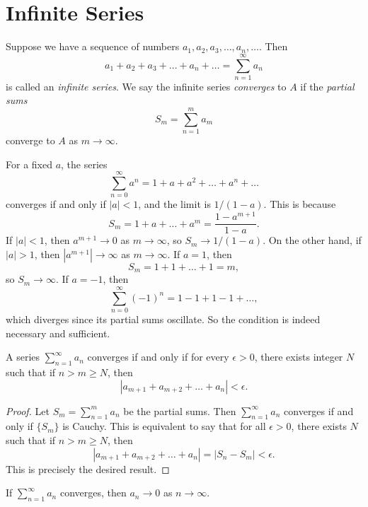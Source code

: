 \section{Infinite Series}
\begin{definition}
Suppose we have a sequence of numbers
$a_1, a_2, a_3, \dots, a_n, \dots$. Then
\[
  a_1 + a_2 + a_3 + \dots + a_n + \dots
  = \sum_{n = 1}^\infty a_n
\]
is called an \emph{infinite series}. We say the
infinite series \emph{converges} to $A$ if
the \emph{partial sums}
\[
  S_m = \sum_{n = 1}^m a_m
\]
converge to $A$ as $m \to \infty$.
\end{definition}

\begin{example}
  For a fixed $a$, the series
  \[
    \sum_{n = 0}^\infty a^n = 1 + a + a^2 + \dots + a^n + \dots
  \]
  converges if and only
  if $|a| < 1$, and the limit is $1 / (1 - a)$. This is
  because
  \[
    S_m = 1 + a + \dots + a^m
    = \frac{1 - a^{m + 1}}{1 - a}.
  \]
  If $|a| < 1$, then $a^{m + 1} \to 0$ as $m \to \infty$,
  so $S_m \to 1 / (1 - a)$. On the other hand,
  if $|a| > 1$, then $|a^{m + 1}| \to \infty$ as $m \to \infty$.
  If $a = 1$, then
  \[
    S_m = 1 + 1 + \dots + 1 = m,
  \]
  so $S_m \to \infty$. If $a = -1$, then
  \[
    \sum_{n = 0}^\infty (-1)^n = 1 - 1 + 1 - 1 + \dots,
  \]
  which diverges since its partial sums
  oscillate. So the condition
  is indeed necessary and sufficient.
\end{example}

\begin{prop}
  A series
  $\sum_{n = 1}^\infty a_n$
  converges if and only if for every $\epsilon > 0$,
  there exists integer $N$ such that if $n > m \ge N$,
  then
  \[|a_{m + 1} + a_{m + 2} + \dots + a_n| < \epsilon.\]
\end{prop}

\begin{proof}
  Let $S_m = \sum_{n = 1}^m a_n$ be the partial
  sums. Then $\sum_{n = 1}^\infty a_n$ converges
  if and only if $\{S_m\}$ is Cauchy. This is equivalent
  to say that for
  all $\epsilon > 0$, there exists $N$ such that if
  $n > m \ge N$, then
  \[
    |a_{m + 1} + a_{m + 2} + \dots + a_n|
    = |S_n - S_m| < \epsilon.
  \]
  This is precisely the desired result.
\end{proof}

\begin{corollary}
  If $\sum_{n = 1}^\infty a_n$ converges, then
  $a_n \to 0$ as $n \to \infty$.
\end{corollary}

